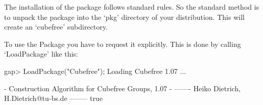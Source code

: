 

\null

The installation of the {\Cubefree} package follows standard {\GAP} rules.
So the standard method is to unpack the package into the `pkg'
directory  of your {\GAP} distribution.  This will create an `cubefree'
subdirectory. 

\null

To use the {\Cubefree} Package you have to request it explicitly. This  is
done by calling `LoadPackage' like this:

\beginexample
gap> LoadPackage("Cubefree");
Loading Cubefree 1.07 ...

   - Construction Algorithm for Cubefree Groups, 1.07 -
   ------- Heiko Dietrich, H.Dietrich@tu-bs.de --------
true
\endexample


